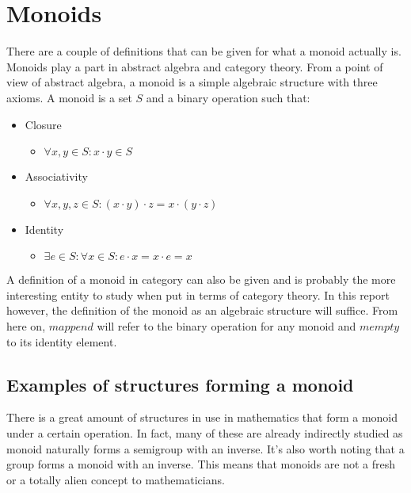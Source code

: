 \documentclass{acm_proc_article-sp}
\begin{document}
{\section{Monoids}
There are a couple of definitions that can be given for what a monoid
actually is. Monoids play a part in abstract algebra and category
theory. From a point of view of abstract algebra, a monoid is a simple
algebraic structure with three axioms. A monoid is a set $S$ and a
binary operation \cdot such that:
\begin{itemize}
\item Closure
  \begin{itemize}
  \item $\forall x,y \in S: x \cdot y \in S$
  \end{itemize}
\item Associativity
  \begin{itemize}
  \item $\forall x,y,z \in S: (x \cdot y) \cdot z = x \cdot (y
    \cdot z)$
  \end{itemize}
\item Identity
  \begin{itemize}
  \item $\exists e \in S: \forall x \in S: e \cdot x = x \cdot e
    = x$
  \end{itemize}
\end{itemize}
A definition of a monoid in category can also be given and is
probably the more interesting entity to study when put in terms of
category theory. In this report however, the definition of the monoid
as an algebraic structure will suffice. From here on, $mappend$ will
refer to the binary operation for any monoid and $mempty$ to its
identity element.
\subsection{Examples of structures forming a monoid}
There is a great amount of structures in use in mathematics that form
a monoid under a certain operation. In fact, many of these are already
indirectly studied as monoid naturally forms a semigroup with an
inverse. It's also worth noting that a group forms a monoid with an
inverse. This means that monoids are not a fresh or a totally alien
concept to mathematicians.

}
\end{document}
